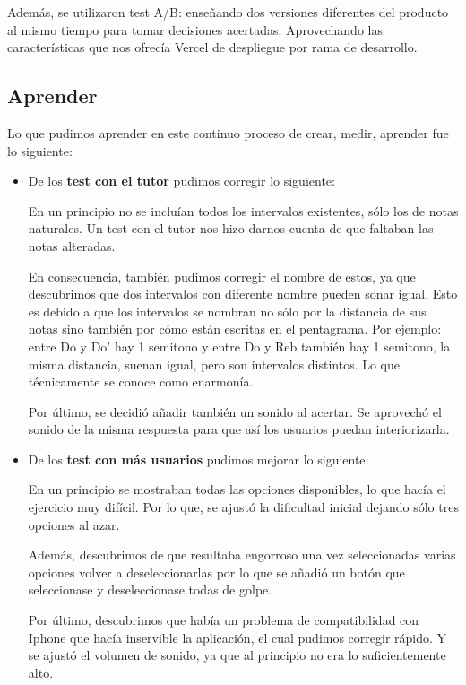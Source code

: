 \documentclass[12pt,twoside,titlepage]{report}
\begin{document}
{Además, se utilizaron test A/B: enseñando dos versiones diferentes del producto al mismo tiempo para tomar decisiones acertadas. Aprovechando las características que nos ofrecía Vercel de despliegue por rama de desarrollo.

\subsection{Aprender}

Lo que pudimos aprender en este continuo proceso de crear, medir, aprender fue lo siguiente:

\begin{itemize}

    \item De los \textbf{test con el tutor} pudimos corregir lo siguiente:
    
    En un principio no se incluían todos los intervalos existentes, sólo los de notas naturales. Un test con el tutor nos hizo darnos cuenta de que faltaban las notas alteradas. 
    
    En consecuencia, también pudimos corregir el nombre de estos, ya que descubrimos que dos intervalos con diferente nombre pueden sonar igual. Esto es debido a que los intervalos se nombran no sólo por la distancia de sus notas sino también por cómo están escritas en el pentagrama. Por ejemplo: entre Do y Do' hay 1 semitono y entre Do y Reb también hay 1 semitono, la misma distancia, suenan igual, pero son intervalos distintos. Lo que técnicamente se conoce como enarmonía.
    
    Por último, se decidió añadir también un sonido al acertar. Se aprovechó el sonido de la misma respuesta para que así los usuarios puedan interiorizarla.
    
    \item De los \textbf{test con más usuarios} pudimos mejorar lo siguiente:

    En un principio se mostraban todas las opciones disponibles, lo que hacía el ejercicio muy difícil. Por lo que, se ajustó la dificultad inicial dejando sólo tres opciones al azar. 
    
    Además, descubrimos de que resultaba engorroso una vez seleccionadas varias opciones volver a deseleccionarlas por lo que se añadió un botón que seleccionase y deseleccionase todas de golpe.
    
    Por último, descubrimos que había un problema de compatibilidad con Iphone que hacía inservible la aplicación, el cual pudimos corregir rápido. Y se ajustó el volumen de sonido, ya que al principio no era lo suficientemente alto.
    

\end{itemize}}
\end{document}

